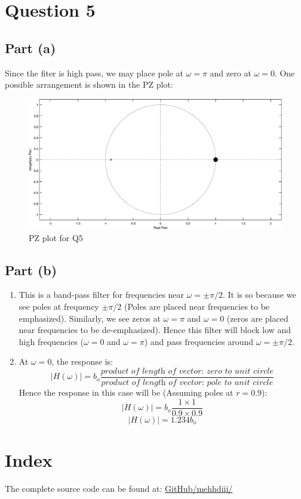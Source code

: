\documentclass[12pt,letterpaper]{article}
\begin{document}
\section*{Question 5}

\subsection*{Part (a)}
Since the fiter is high pass, we may place pole at $\omega = \pi$ and zero at $\omega = 0$. One possible arrangement is shown in the PZ plot:
\begin{figure}[h]
    \centering
    \includegraphics[scale=0.5]{figures/q5task1.eps}
    \caption{PZ plot for Q5}
    \label{PZq5}
\end{figure}
\subsection*{Part (b)}
\begin{enumerate}
    \item This is a band-pass filter for frequencies near $\omega=\pm \pi/ 2$. It is so because we see poles at frequency $\pm \pi/ 2$  (Poles are placed near frequencies to be emphasized). Similarly, we see zeros at $\omega = \pi $ and $\omega = 0$ (zeros are placed near frequencies to be de-emphasized). Hence this filter will block low and high frequencies ($\omega = 0 $ and $\omega = \pi$) and pass frequencies around $\omega = \pm \pi/ 2$. 
    \item 
    At $\omega =0$, the response is: 
    \[
     |H(\omega)| = b_o \dfrac{\textit{product of length of vector: zero to unit circle}}{\textit{product of length of vector: pole to unit circle}}
    \]
    Hence the response in this case will be (Assuming poles at $r = 0.9$): 
    \[
    |H(\omega)| = b_o \dfrac{1\times 1}{0.9 \times 0.9}
    \]
    \[
    |H(\omega)| =  1.234b_o
    \]
\end{enumerate}
\section*{Index}
The complete source code can be found at: \href{https://github.com/mehhdiii/Z-Transform-Basics}{GitHub/mehhdiii/}
\end{document}
